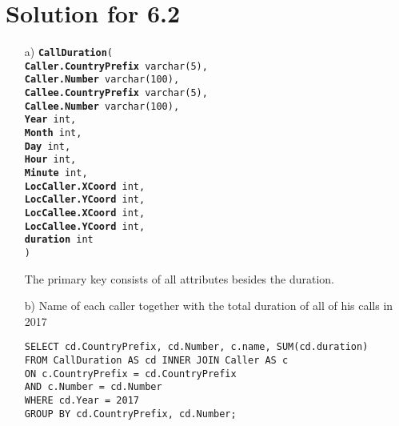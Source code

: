 \documentclass{scrartcl}
\begin{document}
\section*{Solution for 6.2}

\begin{itemize}
\item[a)] \texttt{\textbf{CallDuration}(\\
	\hspace*{10mm}\textbf{Caller.CountryPrefix} varchar(5),\\
	\hspace*{10mm}\textbf{Caller.Number} varchar(100),\\
	\hspace*{10mm}\textbf{Callee.CountryPrefix} varchar(5),\\
	\hspace*{10mm}\textbf{Callee.Number} varchar(100),\\
	\hspace*{10mm}\textbf{Year} int,\\
	\hspace*{10mm}\textbf{Month} int,\\
	\hspace*{10mm}\textbf{Day} int,\\
	\hspace*{10mm}\textbf{Hour} int,\\
	\hspace*{10mm}\textbf{Minute} int,\\
	\hspace*{10mm}\textbf{LocCaller.XCoord} int,\\
	\hspace*{10mm}\textbf{LocCaller.YCoord} int,\\
	\hspace*{10mm}\textbf{LocCallee.XCoord} int,\\
	\hspace*{10mm}\textbf{LocCallee.YCoord} int,\\
	\hspace*{10mm}\textbf{duration} int\\)}

	The primary key consists of all attributes besides the duration. 

\item[b)] Name of each caller together with the total duration of all of his calls in 2017
\begin{lstlisting}
SELECT cd.CountryPrefix, cd.Number, c.name, SUM(cd.duration)
FROM CallDuration AS cd INNER JOIN Caller AS c
ON c.CountryPrefix = cd.CountryPrefix
AND c.Number = cd.Number
WHERE cd.Year = 2017
GROUP BY cd.CountryPrefix, cd.Number;
\end{lstlisting}


\end{itemize}
\end{document}
